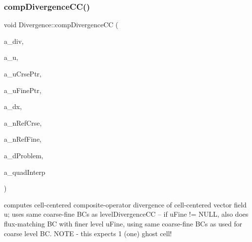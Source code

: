 \subsubsection{\texorpdfstring{comp\+Divergence\+C\+C()}{compDivergenceCC()}\hspace{0.1cm}{\footnotesize\ttfamily [1/4]}}
{\footnotesize\ttfamily void Divergence\+::comp\+Divergence\+CC (\begin{DoxyParamCaption}\item[{\textbf{ Level\+Data}$<$ \textbf{ F\+Array\+Box} $>$ \&}]{a\+\_\+div,  }\item[{\textbf{ Level\+Data}$<$ \textbf{ F\+Array\+Box} $>$ \&}]{a\+\_\+u,  }\item[{\textbf{ Level\+Data}$<$ \textbf{ F\+Array\+Box} $>$ $\ast$}]{a\+\_\+u\+Crse\+Ptr,  }\item[{\textbf{ Level\+Data}$<$ \textbf{ F\+Array\+Box} $>$ $\ast$}]{a\+\_\+u\+Fine\+Ptr,  }\item[{const \textbf{ Real}}]{a\+\_\+dx,  }\item[{const int}]{a\+\_\+n\+Ref\+Crse,  }\item[{const int}]{a\+\_\+n\+Ref\+Fine,  }\item[{const \textbf{ Problem\+Domain} \&}]{a\+\_\+d\+Problem,  }\item[{const bool}]{a\+\_\+quad\+Interp }\end{DoxyParamCaption})\hspace{0.3cm}{\ttfamily [static]}}

computes cell-\/centered composite-\/operator divergence of cell-\/centered vector field u; uses same coarse-\/fine BC\textquotesingle{}s as level\+Divergence\+CC -- if u\+Fine != N\+U\+LL, also does flux-\/matching BC with finer level u\+Fine, using same coarse-\/fine BC\textquotesingle{}s as used for coarse level BC. N\+O\+TE -\/ this expects 1 (one) ghost cell! \mbox{\label{class_divergence_ad1d85e2db60cacec07a004c9d0b19b24}} 

